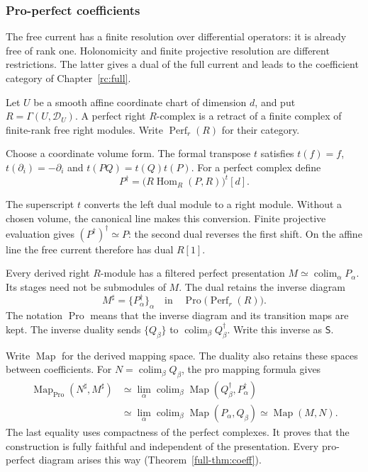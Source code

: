\subsubsection{Pro-perfect coefficients}
\label{ogd:sec:full-coefficients}

The free current has a finite resolution over differential operators:
it is already free of rank one. Holonomicity and finite projective
resolution are different restrictions. The latter gives a dual of
the full current and leads to the coefficient category of
Chapter~\ref{rc:full}.

Let\label{ogd:def:perfect-differential-operator-coefficients} $U$ be a smooth affine coordinate chart of dimension $d$, and put
$R=\Gamma(U,\mathcal D_U)$. A perfect right $R$-complex is a retract
of a finite complex of finite-rank free right modules.
Write $\operatorname{Perf}_r(R)$ for their category.

Choose\label{ogd:def:perfect-coefficient-dual} a coordinate volume form. The formal transpose $t$ satisfies
$t(f)=f$, $t(\partial_i)=-\partial_i$ and $t(PQ)=t(Q)t(P)$.
For a perfect complex define
\[
 P^\dagger=
 \bigl(R\operatorname{Hom}_R(P,R)\bigr)^t[d].
\]

The superscript $t$ converts the left dual module to a right module.
Without a chosen volume, the canonical line makes this conversion.
Finite projective evaluation gives $(P^\dagger)^\dagger\simeq P$:
the second dual reverses the first shift.
On the affine line the free current therefore has dual $R[1]$.

Every derived right $R$-module has a filtered perfect presentation
$M\simeq\operatorname{colim}_\alpha P_\alpha$.
Its stages need not be submodules of $M$.
The dual retains the inverse diagram
\begin{equation}\label{ogd:eq:pro-coefficient}
 M^\sharp=\{P_\alpha^\dagger\}_\alpha
 \quad\text{in}\quad
 \operatorname{Pro}\bigl(\operatorname{Perf}_r(R)\bigr).
\end{equation}
The\label{ogd:def:inverse-pro-perfect-duality} notation $\operatorname{Pro}$ means that the inverse diagram
and its transition maps are kept. The inverse duality sends
$\{Q_\beta\}$ to $\operatorname{colim}_\beta Q_\beta^\dagger$.
Write this inverse as $\mathsf S$.

Write\label{ogd:def:derived-mapping-space} $\operatorname{Map}$ for the derived mapping space.
The duality also retains these spaces between coefficients.
For $N=\operatorname{colim}_\beta Q_\beta$, the pro mapping formula gives
\[
\begin{split}
 \operatorname{Map}_{\operatorname{Pro}}(N^\sharp,M^\sharp)
 &\simeq\lim_\alpha\operatorname{colim}_\beta
       \operatorname{Map}(Q_\beta^\dagger,P_\alpha^\dagger)\\
 &\simeq\lim_\alpha\operatorname{colim}_\beta
       \operatorname{Map}(P_\alpha,Q_\beta)
 \simeq\operatorname{Map}(M,N).
\end{split}
\]
The last equality uses compactness of the perfect complexes.
It proves that the construction is fully faithful and independent
of the presentation. Every pro-perfect diagram arises this way
(Theorem~\ref{full-thm:coeff}).

